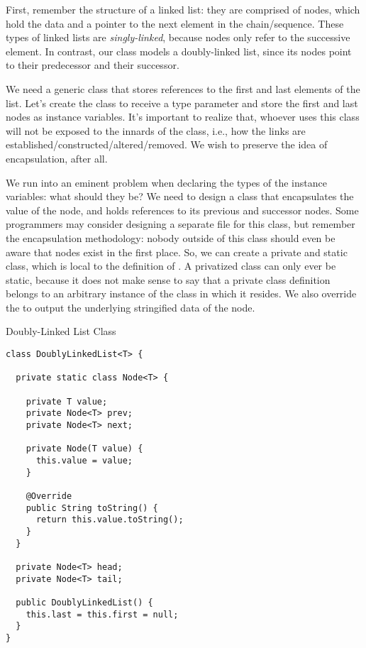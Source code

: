 
First, remember the structure of a linked list: they are comprised of nodes, which hold the data and a pointer to the next element in the chain/sequence. These types of linked lists are \textit{singly-linked}, because nodes only refer to the successive element. In contrast, our class models a doubly-linked list, since its nodes point to their predecessor and their successor. 

We need a generic class that stores references to the first and last elements of the list. Let's create the  class to receive a type parameter  and store the first and last nodes as instance variables. It's important to realize that, whoever uses this class will not be exposed to the innards of the class, i.e., how the links are established/constructed/altered/removed. We wish to preserve the idea of encapsulation, after all.

We run into an eminent problem when declaring the types of the instance variables: what should they be? We need to design a class that encapsulates the value of the node, and holds references to its previous and successor nodes. Some programmers may consider designing a separate  file for this class, but remember the encapsulation methodology: nobody outside of this class should even be aware that nodes exist in the first place. So, we can create a private and static  class, which is local to the definition of . A privatized class can only ever be static, because it does not make sense to say that a private class definition belongs to an arbitrary instance of the class in which it resides. We also override the  to output the underlying stringified data of the node.

\begin{cl}{Doubly-Linked List Class}
\begin{lstlisting}[language=MyJava]
class DoublyLinkedList<T> {

  private static class Node<T> {

    private T value;
    private Node<T> prev;
    private Node<T> next;

    private Node(T value) { 
      this.value = value; 
    }

    @Override
    public String toString() {
      return this.value.toString();
    }
  }

  private Node<T> head;
  private Node<T> tail;

  public DoublyLinkedList() {
    this.last = this.first = null;
  }
}
\end{lstlisting}
\end{cl}

